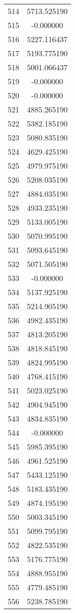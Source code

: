 \documentclass[12pt]{article}
\begin{document}
\begin{longtable}{@{}cc@{}}
514 & 5713.525190 \\
515 & -0.000000 \\
516 & 5227.116437 \\
517 & 5193.775190 \\
518 & 5001.066437 \\
519 & -0.000000 \\
520 & -0.000000 \\
521 & 4885.265190 \\
522 & 5382.185190 \\
523 & 5080.835190 \\
524 & 4629.425190 \\
525 & 4979.975190 \\
526 & 5208.035190 \\
527 & 4884.035190 \\
528 & 4933.235190 \\
529 & 5133.005190 \\
530 & 5070.995190 \\
531 & 5093.645190 \\
532 & 5071.505190 \\
533 & -0.000000 \\
534 & 5137.925190 \\
535 & 5214.905190 \\
536 & 4982.435190 \\
537 & 4813.205190 \\
538 & 4818.845190 \\
539 & 4824.995190 \\
540 & 4768.415190 \\
541 & 5023.025190 \\
542 & 4904.945190 \\
543 & 4834.835190 \\
544 & -0.000000 \\
545 & 5985.395190 \\
546 & 4961.525190 \\
547 & 5433.125190 \\
548 & 5183.435190 \\
549 & 4874.195190 \\
550 & 5003.345190 \\
551 & 5099.795190 \\
552 & 4822.535190 \\
553 & 5176.775190 \\
554 & 4888.955190 \\
555 & 4779.485190 \\
556 & 5238.785190 \\

\end{longtable}
\end{document}
